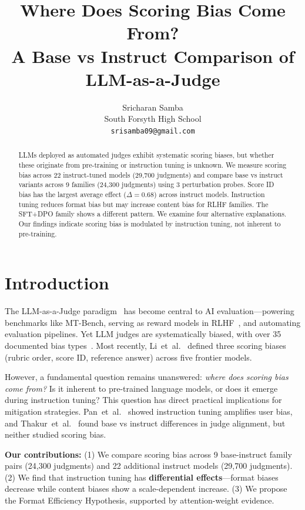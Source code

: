 \documentclass[11pt,a4paper]{article}
\title{Where Does Scoring Bias Come From? \\ A Base vs Instruct Comparison of LLM-as-a-Judge}
\author{Sricharan Samba \\
South Forsyth High School \\
\texttt{srisamba09@gmail.com}}
\date{}
\begin{document}
\maketitle

\begin{abstract}
LLMs deployed as automated judges exhibit systematic scoring biases, but whether these originate from pre-training or instruction tuning is unknown. We measure scoring bias across 22 instruct-tuned models (29,700 judgments) and compare base vs instruct variants across 9 families (24,300 judgments) using 3 perturbation probes. Score ID bias has the largest average effect ($\Delta=0.68$) across instruct models. Instruction tuning reduces format bias but may increase content bias for RLHF families. The SFT+DPO family shows a different pattern. We examine four alternative explanations. Our findings indicate scoring bias is modulated by instruction tuning, not inherent to pre-training.
\end{abstract}

\section{Introduction}

The LLM-as-a-Judge paradigm~\cite{zheng2023judging} has become central to AI evaluation---powering benchmarks like MT-Bench, serving as reward models in RLHF~\cite{bai2022constitutional}, and automating evaluation pipelines. Yet LLM judges are systematically biased, with over 35 documented bias types~\cite{ye2024justice,gu2024survey}. Most recently, Li~et~al.~\cite{li2025scoring} defined three scoring biases (rubric order, score ID, reference answer) across five frontier models.

However, a fundamental question remains unanswered: \emph{where does scoring bias come from?} Is it inherent to pre-trained language models, or does it emerge during instruction tuning? This question has direct practical implications for mitigation strategies. Pan~et~al.~\cite{pan2025user} showed instruction tuning amplifies user bias, and Thakur~et~al.~\cite{thakur2024judging} found base vs instruct differences in judge alignment, but neither studied scoring bias.

\textbf{Our contributions:} (1) We compare scoring bias across 9 base-instruct family pairs (24,300 judgments) and 22 additional instruct models (29,700 judgments). (2) We find that instruction tuning has \textbf{differential effects}---format biases decrease while content biases show a scale-dependent increase. (3) We propose the Format Efficiency Hypothesis, supported by attention-weight evidence.
\end{document}
